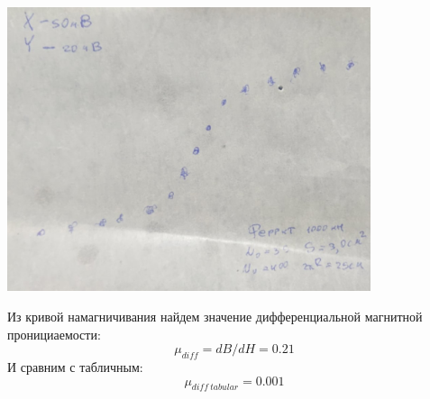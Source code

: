 \documentclass[12pt]{article}
\begin{document}
\begin{minipage}{0.5\textwidth}
\begin{center}
    \includegraphics[width=0.8\textwidth]{fer.jpg}
    \label{fer}
\end{center}
\end{minipage}
\begin{minipage}{0.5\textwidth}
Из кривой намагничивания найдем значение дифференциальной магнитной пронициаемости:
    \begin{equation*}
        \mu_{diff} = dB/dH = 0.21
    \end{equation*}
И сравним с табличным:
    \begin{equation*}
        \mu_{diff\: tabular} =  0.001
    \end{equation*}
\end{minipage}
\end{document}
